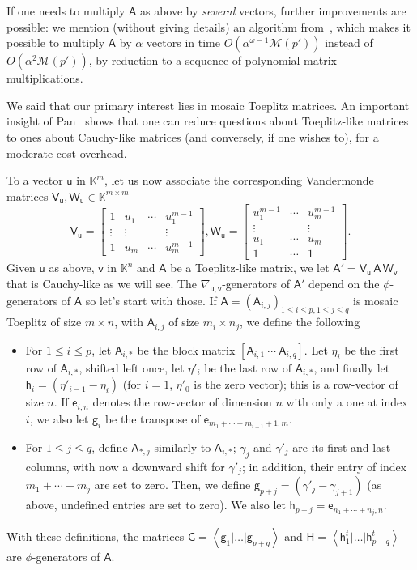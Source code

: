 \documentclass{sig-alternate}
\newcommand{\ve}{\ensuremath{\mathsf{e}}}
\newcommand{\vg}{\ensuremath{\mathsf{g}}}
\newcommand{\vh}{\ensuremath{\mathsf{h}}}
\newcommand{\vu}{\ensuremath{\mathsf{u}}}
\newcommand{\vv}{\ensuremath{\mathsf{v}}}
\newcommand{\mA}{\ensuremath{\mathsf{A}}}
\newcommand{\mG}{\ensuremath{\mathsf{G}}}
\newcommand{\mH}{\ensuremath{\mathsf{H}}}
\newcommand{\mV}{\ensuremath{\mathsf{V}}}
\newcommand{\mW}{\ensuremath{\mathsf{W}}}
\newcommand{\K}{\ensuremath{\mathbb{K}}}
\newcommand{\M}{\ensuremath{\mathscr{M}}}
\begin{document}
If one needs to multiply $\mA$ as above by {\em several} vectors, further
improvements are possible: we mention (without giving details) an algorithm
from~\cite{BoJeSc08,BoJeMoSc16}, which makes it possible to multiply $\mA$ by $\alpha$
vectors in time $O(\alpha^{\omega-1} \M(p'))$ instead of $O(\alpha^2 \M(p'))$,
by reduction to a sequence of polynomial matrix multiplications.

\smallskip{}
 We said that our primary interest lies in mosaic
Toep\-litz matrices. An important insight of Pan~\cite{Pan90} shows
that one can reduce questions about Toeplitz-like matrices to ones
about Cauchy-like matrices (and conversely, if one wishes to), for a
moderate cost overhead.

To a vector $\vu$ in $\K^m$, let us now associate the corresponding Vandermonde
matrices $\mV_\vu, \mW_\vu \in \K^{m \times m}$
$$
\mV_\vu = 
\begin{bmatrix}
  1 & u_1 & \cdots & u_1^{m - 1}\\
  \vdots & \vdots &  & \vdots\\
  1 & u_m & \cdots & u_m^{m - 1}
\end{bmatrix},
\mW_\vu = 
\begin{bmatrix}
  u_1^{m - 1} & \cdots & u_m^{m - 1}\\
  \vdots &  & \vdots\\
  u_1 & \cdots & u_m\\
  1 & \cdots & 1
\end{bmatrix}.
$$
Given $\vu$ as above, $\vv$ in $\K^n$ and $\mA$ be a Toeplitz-like matrix, we
let $\mA' = \mV_\vu\, \mA\, \mW_\vv$ that is Cauchy-like as we will see. The
$\nabla_{\vu,\vv}$-generators of $\mA'$ depend on the $\phi$-generators of $\mA$
so let's start with those. If $\mA=(\mA_{i,j})_{1 \le i \le p,1 \le j \le q}$ is
mosaic Toeplitz of size $m \times n$, with $\mA_{i,j}$ of size $m_i \times n_j$,
we define the following
\begin{itemize}
\item For $1 \le i \le p$, let $\mA_{i,*}$ be the block matrix
  $[\mA_{i,1}~\cdots~\mA_{i,q}]$.  Let $\eta_i$ be the first row of $\mA_{i,*}$,
  shifted left once, let $\eta'_i$ be the last row of $\mA_{i,*}$, and finally
  let $\vh_i=(\eta'_{i-1}-\eta_i)$ (for $i=1$, $\eta'_0$ is the zero vector);
  this is a row-vector of size $n$. If $\ve_{i,n}$ denotes the row-vector of
  dimension $n$ with only a one at index $i$, we also let $\vg_{i}$ be the
  transpose of $\ve_{m_1 + \cdots +m_{i-1}+1,m}$.
  
\item For $1 \le j \le q$, define $\mA_{*,j}$ similarly to $\mA_{i,*}$;
  $\gamma_j$ and $\gamma'_j$ are its first and last columns, with now a downward
  shift for $\gamma'_j$; in addition, their entry of index $m_1 + \cdots + m_j$
  are set to zero. Then, we define $\vg_{p+j}=(\gamma'_{j}-\gamma_{j+1})$ (as
  above, undefined entries are set to zero).  We also let
  $\vh_{p+j}=\ve_{n_1 + \cdots +n_j,n}$.
\end{itemize}
With these definitions, the matrices
$\mG=\left< \vg_1 | \dots | \vg_{p+q} \right>$ and
$\mH= \left<\vh^t_1 | \dots | \vh^t_{p+q} \right>$ are $\phi$-generators of
$\mA$.
\end{document}

